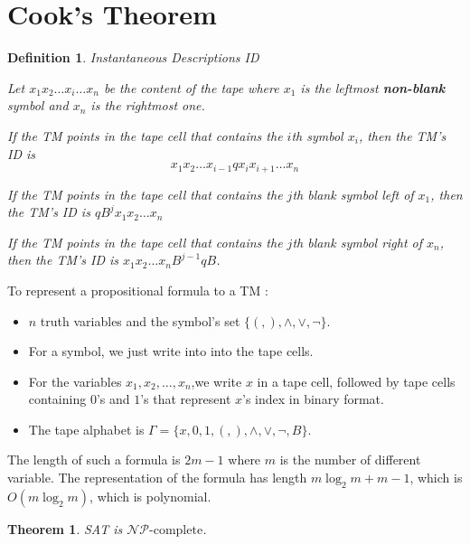 \documentclass[a4paper,11pt]{report}
\newtheorem*{mydef}{Definition}
\newtheorem{theorem}{Theorem}
\newcommand{\NPCc}{\ensuremath{\mathcal{NP}\text{-complete}}}
\begin{document}
\section{Cook's Theorem}

\begin{mydef}
  Instantaneous Descriptions ID

  Let $x_1x_2\dots x_i \dots x_n$ be the content of the tape where $x_1$ is the
  leftmost \textbf{non-blank} symbol and $x_n$ is the rightmost one.

  If the TM points in the tape cell that contains the $i$th symbol $x_i$, then
  the TM's ID is
  \[
    x_1x_2\dots x_{i-1}q x_i x_{i+1}\dots x_n
  \]
  
  If the TM points in the tape cell that contains the $j$th blank symbol left of
  $x_1$, then the TM's ID is $qB^jx_1x_2\dots x_n$
  
  If the TM points in the tape cell that contains the $j$th blank symbol right
  of $x_n$, then the TM's ID is $x_1x_2\dots x_n B^{j-1}qB$.
\end{mydef}

To represent a propositional formula to a TM :
\begin{itemize}
\item $n$ truth variables and the symbol's set $\{ (,),\wedge,\vee,\neg \}$.
\item For a symbol, we just write into into the tape cells.
\item For the variables $x_1,x_2,\dots,x_n$,we write $x$ in a tape cell,
  followed by tape cells containing $0$'s and $1$'s that represent $x$'s index
  in binary format.
\item The tape alphabet is $\Gamma = \{x,0,1,(,),\wedge,\vee,\neg,B\}$.
\end{itemize}

The length of such a formula is $2m-1$ where $m$ is the number of different
variable. The representation of the formula has length $m \log_2 m + m - 1$,
which is $O(m \log_2 m)$, which is polynomial.

\begin{theorem}
  SAT is \NPCc.
\end{theorem}
\end{document}
